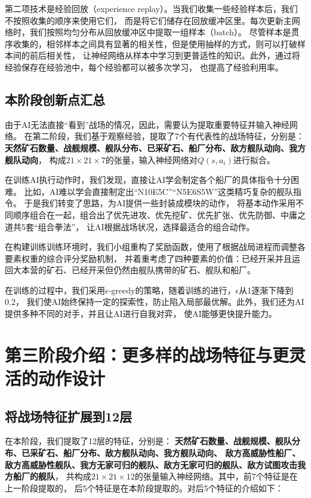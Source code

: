 \documentclass{article}
\begin{document}
第二项技术是经验回放（experience replay）。当我们收集一些经验样本后，我们不按照收集的顺序来使用它们，
而是将它们储存在回放缓冲区里。每次更新主网络时，我们按照均匀分布从回放缓冲区中提取一组样本（batch）。
尽管样本是贯序收集的，相邻样本之间具有显著的相关性，但是使用抽样的方式，则可以打破样本间的前后相关性，
让神经网络从样本中学习到更普适性的知识。此外，通过将经验保存在经验池中，每个经验都可以被多次学习，
也提高了经验利用率。

\subsection{本阶段创新点汇总}
由于AI无法直接“看到”战场的情况，因此，需要认为提取重要特征并输入神经网络。
在第二阶段，我们基于观察经验，提取了7个有代表性的战场特征，分别是：
\textbf{天然矿石数量、战舰规模、舰队分布、已采矿石、船厂分布、敌方舰队动向、我方舰队动向}，
构成$21 \times 21 \times 7$的张量，输入神经网络对$Q(s, a_i)$进行拟合。

在训练AI执行动作时，我们发现，直接让AI学会制定各个船厂的具体指令十分困难。
比如，AI难以学会直接制定出“N10E5C”“N5E6S5W”这类精巧复杂的舰队指令。
于是我们转变了思路，为AI提供一些封装成模块的动作，
将基本动作采用不同顺序组合在一起，组合出了优先进攻、优先挖矿、优先扩张、优先防御、中庸之道共5套“组合拳法”，
让AI根据战场状况，选择最适合的组合动作。

在构建训练训练环境时，我们小组重构了奖励函数，使用了根据战局进程而调整各要素权重的综合评分奖励机制，
并着重考虑了四种要素的价值：已经开采并且运回大本营的矿石、已经开采但仍然由舰队携带的矿石、舰队和船厂。 

在训练的过程中，我们采用$\epsilon$-greedy的策略，随着训练的进行，$\epsilon$从1逐渐下降到0.2，
我们使AI始终保持一定的探索性，防止陷入局部最优解。此外，我们还为AI提供多种不同的对手，并且让AI进行自我对弈，
使AI能够更快提升能力。

\section{第三阶段介绍：更多样的战场特征与更灵活的动作设计}
\subsection{将战场特征扩展到12层}
在本阶段，我们提取了12层的特征，分别是：
\textbf{天然矿石数量、战舰规模、舰队分布、已采矿石、船厂分布、敌方舰队动向、我方舰队动向、
敌方高威胁性船厂、敌方高威胁性舰队、我方无家可归的舰队、敌方无家可归的舰队、敌方试图攻击我方船厂的舰队}，
共构成$21\times 21 \times 12$的张量输入神经网络。其中，前7个特征是在上一阶段提取的，
后5个特征是在本阶段提取的。对后5个特征的介绍如下：
\end{document}
